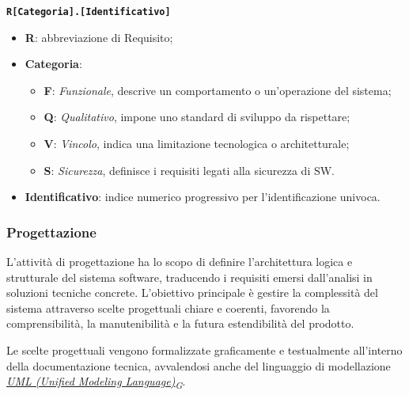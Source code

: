 \documentclass[12pt, a4paper]{article}
\newcommand{\urlglossario}{https://skynetunigroup.github.io/Code_Guardian/Documentazione/RTB/glossario_v1.0.0.pdf} %
\newcommand{\glo}[2]{\href{\urlglossario\#nameddest=#2}{#1\textsubscript{G}}}
\begin{document}
\begin{center}
\textbf{\texttt{R[Categoria].[Identificativo]}}
\end{center}
\begin{itemize}
    \item \textbf{R}: abbreviazione di Requisito;
    \item \textbf{Categoria}:
    \begin{itemize}
        \item \textbf{F}: \textit{Funzionale}, descrive un comportamento o un'operazione del sistema;
        \item \textbf{Q}: \textit{Qualitativo}, impone uno standard di sviluppo da rispettare;
        \item \textbf{V}: \textit{Vincolo}, indica una limitazione tecnologica o architetturale;
        \item \textbf{S}: \textit{Sicurezza}, definisce i requisiti legati alla sicurezza di SW.
    \end{itemize}
    \item \textbf{Identificativo}: indice numerico progressivo per l'identificazione univoca.
\end{itemize}

\subsubsection{Progettazione}

L'attività di progettazione ha lo scopo di definire l'architettura logica e strutturale del sistema software, traducendo i requisiti emersi dall'analisi in soluzioni tecniche concrete. L'obiettivo principale è gestire la complessità del sistema attraverso scelte progettuali chiare e coerenti, favorendo la comprensibilità, la manutenibilità e la futura estendibilità del prodotto.

Le scelte progettuali vengono formalizzate graficamente e testualmente all'interno della documentazione tecnica, avvalendosi anche del linguaggio di modellazione \textit{\glo{UML (Unified Modeling Language)}{uml}}.
\end{document}
